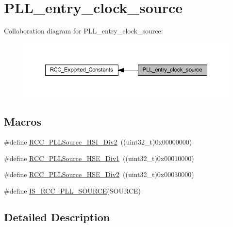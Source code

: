 \hypertarget{group___p_l_l__entry__clock__source}{}\section{P\+L\+L\+\_\+entry\+\_\+clock\+\_\+source}
\label{group___p_l_l__entry__clock__source}
Collaboration diagram for P\+L\+L\+\_\+entry\+\_\+clock\+\_\+source\+:
\nopagebreak
\begin{figure}[H]
\begin{center}
\leavevmode
\includegraphics[width=350pt]{group___p_l_l__entry__clock__source}
\end{center}
\end{figure}
\subsection*{Macros}
\begin{DoxyCompactItemize}
\item 
\#define \hyperlink{group___p_l_l__entry__clock__source_ga53194dd3e2986980b156a3e8e456df06}{R\+C\+C\+\_\+\+P\+L\+L\+Source\+\_\+\+H\+S\+I\+\_\+\+Div2}~((uint32\+\_\+t)0x00000000)
\item 
\#define \hyperlink{group___p_l_l__entry__clock__source_ga62f02bf60a89bdef0d3a8137da3f4c2d}{R\+C\+C\+\_\+\+P\+L\+L\+Source\+\_\+\+H\+S\+E\+\_\+\+Div1}~((uint32\+\_\+t)0x00010000)
\item 
\#define \hyperlink{group___p_l_l__entry__clock__source_ga24863bc670737a2f5abce546a49e620c}{R\+C\+C\+\_\+\+P\+L\+L\+Source\+\_\+\+H\+S\+E\+\_\+\+Div2}~((uint32\+\_\+t)0x00030000)
\item 
\#define \hyperlink{group___p_l_l__entry__clock__source_ga8a8a84a16989bb4e5aca1af65ccf9a1b}{I\+S\+\_\+\+R\+C\+C\+\_\+\+P\+L\+L\+\_\+\+S\+O\+U\+R\+CE}(S\+O\+U\+R\+CE)
\end{DoxyCompactItemize}


\subsection{Detailed Description}



